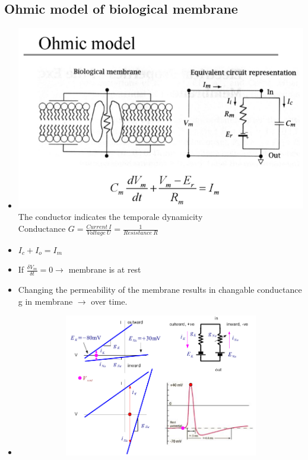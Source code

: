 \documentclass[english,11pt]{article}
\begin{document}
\subsection{Ohmic model of biological membrane}
\begin{itemize}
\item \includegraphics[width=\textwidth]{ohmic-model.png}\\
The conductor indicates the temporale dynamicity\\
Conductance $G = \frac{Current~I}{Voltage~U} = \frac{1}{Resistance~R}$ 
\item $I_c + I_o = I_m$
\item If $\frac{\delta V_m}{\delta t} = 0 \rightarrow$ membrane is at rest
\item Changing the permeability of the membrane results in changable conductance g in membrane $\rightarrow$ over time.
\item
\begin{figure}[H]
        \centering
        \begin{subfigure}[b]{0.5\textwidth}
                \centering
\includegraphics[width=\textwidth]{ohmic-model2.png}

\end{subfigure}
\end{figure}
\end{itemize}
\end{document}
